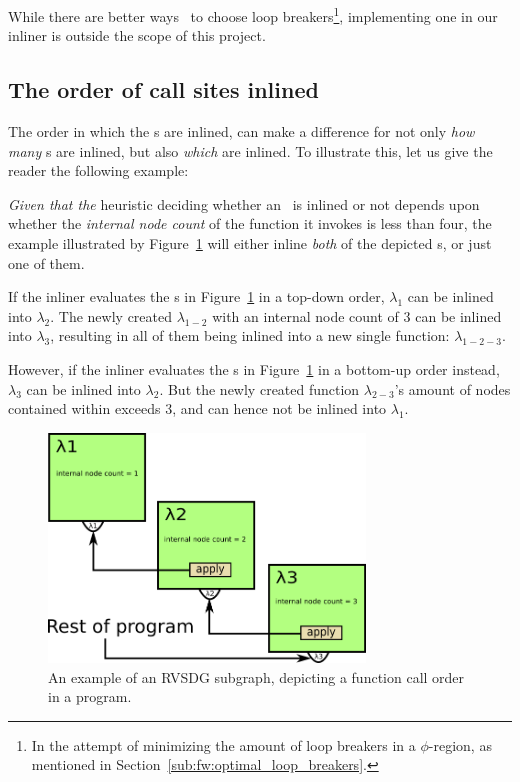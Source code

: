 While there are better ways~\cite{BasMscThesis} to choose loop
breakers\footnote{In the attempt of minimizing the amount of loop breakers in a
$\phi$-region, as mentioned in Section~\ref{sub:fw:optimal_loop_breakers}.},
implementing one in our inliner is outside the scope of this project.

\subsection{The order of call sites inlined}
\label{sub:scheme:ordering_apply_nodes}

The order in which the \applyNode s are inlined, can make a difference for not
only \textit{how many} \applyNode s are inlined, but also \textit{which} are
inlined. To illustrate this, let us give the reader the following example:

\textit{Given that the} heuristic deciding whether an \applyNode~is inlined or
not depends upon whether the \textit{internal node count} of the function it
invokes is less than four, the example illustrated by
Figure~\ref{fig:inline_ordering_ex} will either inline \textit{both} of the
depicted \applyNode s, or just one of them.

If the inliner evaluates the \applyNode s in Figure~\ref{fig:inline_ordering_ex}
in a top-down order, $\lambda_1$ can be inlined into $\lambda_2$. The newly
created $\lambda_{1-2}$ with an internal node count of $3$ can be inlined into
$\lambda_3$, resulting in all of them being inlined into a new single function:
$\lambda_{1-2-3}$.

However, if the inliner evaluates the \applyNode s in
Figure~\ref{fig:inline_ordering_ex} in a bottom-up order instead, $\lambda_3$
can be inlined into $\lambda_2$. But the newly created function
$\lambda_{2-3}$'s amount of nodes contained within exceeds 3, and can hence not
be inlined into $\lambda_1$.

\begin{figure}[H]
	\centering
	\includegraphics[width=0.75\textwidth]{figures/svg/inline_ordering_ex}
	\caption{An example of an RVSDG subgraph, depicting a function call
order in a program.}
	\label{fig:inline_ordering_ex}
\end{figure}

